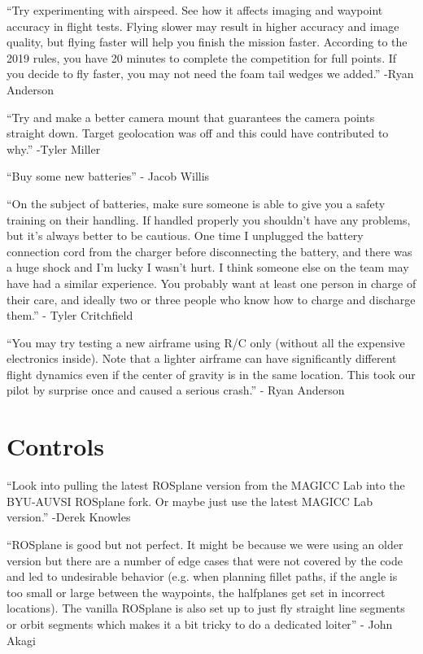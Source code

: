 {}

{``Try experimenting with airspeed. See how it affects imaging and
waypoint accuracy in flight tests. Flying slower may result in higher
accuracy and image quality, but flying faster will help you finish the
mission faster. According to the 2019 rules, you have 20 minutes to
complete the competition for full points. If you decide to fly faster,
you may not need the foam tail wedges we added.'' -Ryan Anderson}

{}

{``Try and make a better camera mount that guarantees the camera points
straight down. Target geolocation was off and this could have
contributed to why.'' -Tyler Miller}

{}

{``Buy some new batteries'' - Jacob Willis}

{}

{``On the subject of batteries, make sure someone is able to give you a
safety training on their handling. If handled properly you shouldn't
have any problems, but it's always better to be cautious. One time I
unplugged the battery connection cord from the charger before
disconnecting the battery, and there was a huge shock and I'm lucky I
wasn't hurt. I think someone else on the team may have had a similar
experience. You probably want at least one person in charge of their
care, and ideally two or three people who know how to charge and
discharge them.'' - Tyler Critchfield}

{}

{``You may try testing a new airframe using R/C only (without all the
expensive electronics inside). Note that a lighter airframe can have
significantly different flight dynamics even if the center of gravity is
in the same location. This took our pilot by surprise once and caused a
serious crash.'' - Ryan Anderson}

\hypertarget{h.juthe769iomo}{\section{\texorpdfstring{{Controls}}{Controls}}\label{h.juthe769iomo}}

{``Look into pulling the latest ROSplane version from the MAGICC Lab
into the BYU-AUVSI ROSplane fork. Or maybe just use the latest MAGICC
Lab version.'' -Derek Knowles}

{}

{``ROSplane is good but not perfect. It might be because we were using
an older version but there are a number of edge cases that were not
covered by the code and led to undesirable behavior (e.g. when planning
fillet paths, if the angle is too small or large between the waypoints,
the halfplanes get set in incorrect locations). The vanilla ROSplane is
also set up to just fly straight line segments or orbit segments which
makes it a bit tricky to do a dedicated loiter'' - John Akagi}


